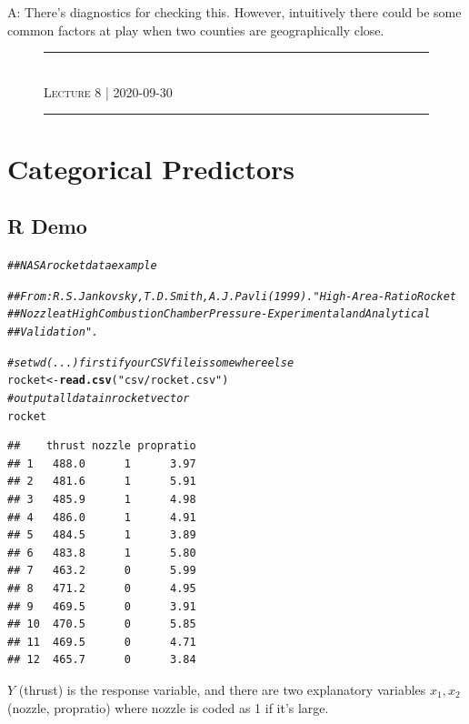 \documentclass[oneside]{book}\usepackage[]{graphicx}\usepackage[dvipsnames,table,xcdraw]{xcolor}
\makeatletter
\newcommand{\hlstr}[1]{\textcolor[rgb]{0.192,0.494,0.8}{#1}}%
\newcommand{\hlcom}[1]{\textcolor[rgb]{0.678,0.584,0.686}{\textit{#1}}}%
\newcommand{\hlstd}[1]{\textcolor[rgb]{0.345,0.345,0.345}{#1}}%
\newcommand{\hlkwb}[1]{\textcolor[rgb]{0.69,0.353,0.396}{#1}}%
\newcommand{\hlkwd}[1]{\textcolor[rgb]{0.737,0.353,0.396}{\textbf{#1}}}%
\newenvironment{kframe}{%
 \def\at@end@of@kframe{}%
 \ifinner\ifhmode%
  \def\at@end@of@kframe{\end{minipage}}%
  \begin{minipage}{\columnwidth}%
 \fi\fi%
 \def\FrameCommand##1{\hskip\@totalleftmargin \hskip-\fboxsep
 \colorbox{shadecolor}{##1}\hskip-\fboxsep
     \hskip-\linewidth \hskip-\@totalleftmargin \hskip\columnwidth}%
 \MakeFramed {\advance\hsize-\width
   \@totalleftmargin\z@ \linewidth\hsize
   \@setminipage}}%
 {\par\unskip\endMakeFramed%
 \at@end@of@kframe}
\newenvironment{knitrout}{}{} %
\newcommand{\makeheading}[1]
{
    \begin{figure}[H]
        \centering
        \rule{\columnwidth}{1pt}\\
        {\large \scshape{#1}}\\[-0.6\baselineskip]
        \rule{\columnwidth}{1pt}
        \vspace*{-20pt}
    \end{figure}
}
\makeatother
\begin{document}
A: There's diagnostics for checking this. However,
intuitively there could be some common factors
at play when two counties are geographically close.




\makeheading{Lecture 8 | 2020-09-30}
\section{Categorical Predictors}
\subsection{R Demo}
\begin{knitrout}
\color{fgcolor}\begin{kframe}
\begin{alltt}
\hlcom{## NASA rocket data example}

\hlcom{## From: R.S. Jankovsky, T.D. Smith, A.J. Pavli (1999). "High-Area-Ratio Rocket}
\hlcom{## Nozzle at High Combustion Chamber Pressure-Experimental and Analytical}
\hlcom{## Validation".}

\hlcom{# setwd(...) first if your CSV file is somewhere else}
\hlstd{rocket} \hlkwb{<-} \hlkwd{read.csv}\hlstd{(}\hlstr{"csv/rocket.csv"}\hlstd{)}
\hlcom{# output all data in rocket vector}
\hlstd{rocket}
\end{alltt}
\begin{verbatim}
##    thrust nozzle propratio
## 1   488.0      1      3.97
## 2   481.6      1      5.91
## 3   485.9      1      4.98
## 4   486.0      1      4.91
## 5   484.5      1      3.89
## 6   483.8      1      5.80
## 7   463.2      0      5.99
## 8   471.2      0      4.95
## 9   469.5      0      3.91
## 10  470.5      0      5.85
## 11  469.5      0      4.71
## 12  465.7      0      3.84
\end{verbatim}
\end{kframe}
\end{knitrout}

$Y$ (thrust) is the response variable, and there
are two explanatory variables $x_1,x_2$
(nozzle, propratio) where nozzle is coded
as 1 if it's large.
\end{document}
